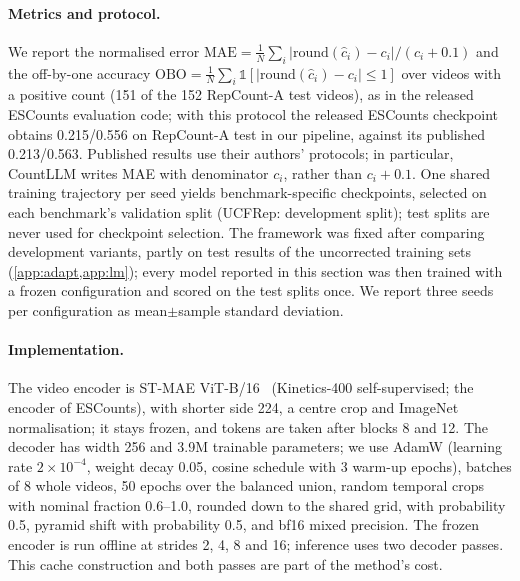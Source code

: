 \paragraph{Metrics and protocol.}
We report the normalised error
$\mathrm{MAE}=\frac{1}{N}\sum_i |\mathrm{round}(\hat c_i)-c_i|/(c_i+0.1)$ and
the off-by-one accuracy
$\mathrm{OBO}=\frac{1}{N}\sum_i\mathbb{1}[|\mathrm{round}(\hat c_i)-c_i|\le1]$
over videos with a positive count (151 of the 152 RepCount-A test videos), as in the released ESCounts
evaluation code; with this protocol the released ESCounts checkpoint obtains
0.215/0.556 on RepCount-A test in our pipeline, against its published
0.213/0.563. Published results use their authors' protocols; in particular,
CountLLM writes MAE with denominator $c_i$, rather than $c_i+0.1$.
One shared training trajectory per seed yields benchmark-specific checkpoints,
selected on each benchmark's validation split (UCFRep: development split);
test splits are never used for checkpoint selection. The framework was fixed after
comparing development variants, partly on test results of the uncorrected
training sets (\cref{app:adapt,app:lm}); every model reported in this section was
then trained with a frozen configuration and scored on the test splits once.
We report three seeds per configuration as mean$\pm$sample standard deviation.

\paragraph{Implementation.}
The video encoder is ST-MAE ViT-B/16~\cite{feichtenhofer2022masked}
(Kinetics-400 self-supervised; the encoder of ESCounts), with shorter side 224, a
centre crop and ImageNet normalisation; it stays frozen, and tokens are taken
after blocks 8 and 12. The decoder has width 256 and 3.9M trainable parameters;
we use AdamW (learning rate $2\times10^{-4}$, weight decay 0.05, cosine schedule
with 3 warm-up epochs), batches of 8 whole videos, 50 epochs over the balanced
union, random temporal crops with nominal fraction 0.6--1.0, rounded down to
the shared grid, with probability
0.5, pyramid shift with probability 0.5, and bf16 mixed precision. The frozen
encoder is run offline at strides 2, 4, 8 and 16; inference uses two decoder
passes. This cache construction and both passes are part of the method's cost.


